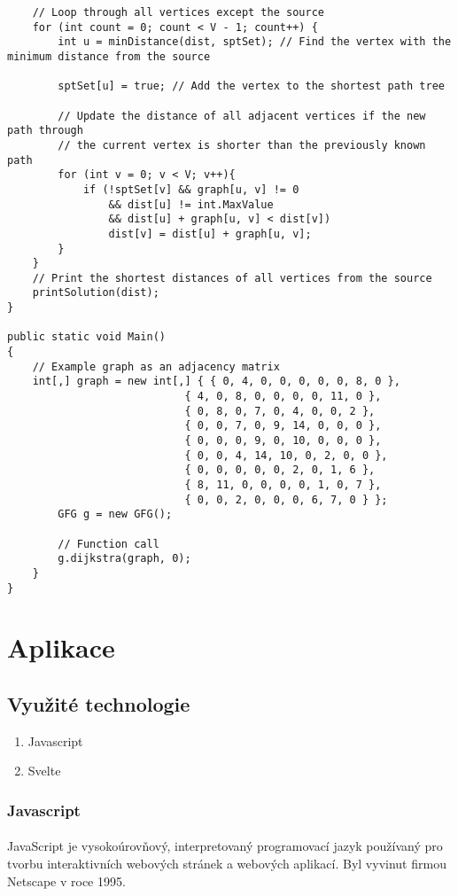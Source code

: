 \documentclass[12pt]{article}
\begin{document}
\begin{lstlisting}
    // Loop through all vertices except the source
    for (int count = 0; count < V - 1; count++) {
        int u = minDistance(dist, sptSet); // Find the vertex with the minimum distance from the source

        sptSet[u] = true; // Add the vertex to the shortest path tree

        // Update the distance of all adjacent vertices if the new path through
        // the current vertex is shorter than the previously known path
        for (int v = 0; v < V; v++){
            if (!sptSet[v] && graph[u, v] != 0
                && dist[u] != int.MaxValue
                && dist[u] + graph[u, v] < dist[v])
                dist[v] = dist[u] + graph[u, v];
        }
    }
    // Print the shortest distances of all vertices from the source
    printSolution(dist);
}

public static void Main()
{
    // Example graph as an adjacency matrix
    int[,] graph = new int[,] { { 0, 4, 0, 0, 0, 0, 0, 8, 0 },
                            { 4, 0, 8, 0, 0, 0, 0, 11, 0 },
                            { 0, 8, 0, 7, 0, 4, 0, 0, 2 },
                            { 0, 0, 7, 0, 9, 14, 0, 0, 0 },
                            { 0, 0, 0, 9, 0, 10, 0, 0, 0 },
                            { 0, 0, 4, 14, 10, 0, 2, 0, 0 },
                            { 0, 0, 0, 0, 0, 2, 0, 1, 6 },
                            { 8, 11, 0, 0, 0, 0, 1, 0, 7 },
                            { 0, 0, 2, 0, 0, 0, 6, 7, 0 } };
        GFG g = new GFG();
 
        // Function call
        g.dijkstra(graph, 0);
    }
}
\end{lstlisting}
\section{Aplikace}
\subsection{Využité technologie}
\begin{enumerate}
    \item Javascript
    \item Svelte
\end{enumerate}
\subsubsection{Javascript}
\paragraph{}
JavaScript je vysokoúrovňový, interpretovaný programovací jazyk používaný pro tvorbu interaktivních 
webových stránek a webových aplikací. Byl vyvinut firmou Netscape v roce 1995.
\end{document}
